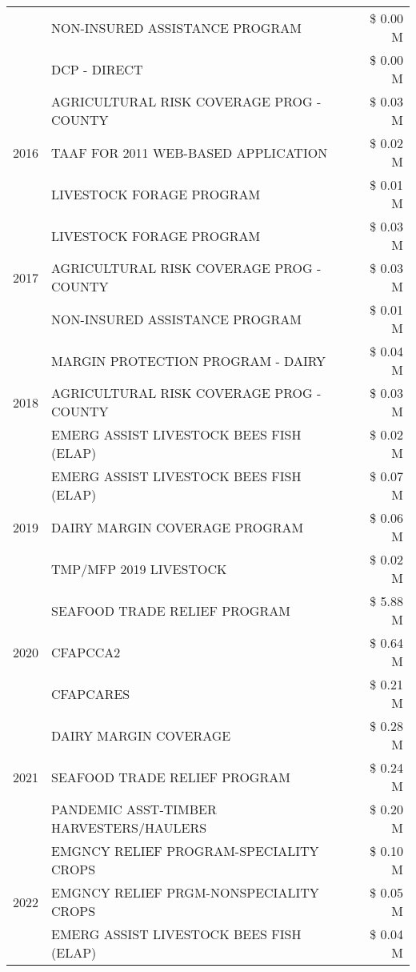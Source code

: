 \begin{tabular}{llr}
 & NON-INSURED ASSISTANCE PROGRAM & \$ 0.00 M \\
 & DCP - DIRECT & \$ 0.00 M \\
\cline{1-3}
\multirow[t]{3}{*}{2016} & AGRICULTURAL RISK COVERAGE PROG - COUNTY & \$ 0.03 M \\
 & TAAF FOR 2011 WEB-BASED APPLICATION & \$ 0.02 M \\
 & LIVESTOCK FORAGE PROGRAM & \$ 0.01 M \\
\cline{1-3}
\multirow[t]{3}{*}{2017} & LIVESTOCK FORAGE PROGRAM & \$ 0.03 M \\
 & AGRICULTURAL RISK COVERAGE PROG - COUNTY & \$ 0.03 M \\
 & NON-INSURED ASSISTANCE PROGRAM & \$ 0.01 M \\
\cline{1-3}
\multirow[t]{3}{*}{2018} & MARGIN PROTECTION PROGRAM - DAIRY & \$ 0.04 M \\
 & AGRICULTURAL RISK COVERAGE PROG - COUNTY & \$ 0.03 M \\
 & EMERG ASSIST LIVESTOCK BEES FISH (ELAP) & \$ 0.02 M \\
\cline{1-3}
\multirow[t]{3}{*}{2019} & EMERG ASSIST LIVESTOCK BEES FISH (ELAP) & \$ 0.07 M \\
 & DAIRY MARGIN COVERAGE PROGRAM & \$ 0.06 M \\
 & TMP/MFP 2019 LIVESTOCK & \$ 0.02 M \\
\cline{1-3}
\multirow[t]{3}{*}{2020} & SEAFOOD TRADE RELIEF PROGRAM & \$ 5.88 M \\
 & CFAPCCA2 & \$ 0.64 M \\
 & CFAPCARES & \$ 0.21 M \\
\cline{1-3}
\multirow[t]{3}{*}{2021} & DAIRY MARGIN COVERAGE & \$ 0.28 M \\
 & SEAFOOD TRADE RELIEF PROGRAM & \$ 0.24 M \\
 & PANDEMIC ASST-TIMBER HARVESTERS/HAULERS & \$ 0.20 M \\
\cline{1-3}
\multirow[t]{3}{*}{2022} & EMGNCY RELIEF PROGRAM-SPECIALITY CROPS & \$ 0.10 M \\
 & EMGNCY RELIEF PRGM-NONSPECIALITY CROPS & \$ 0.05 M \\
 & EMERG ASSIST LIVESTOCK BEES FISH (ELAP) & \$ 0.04 M \\
\cline{1-3}
\bottomrule
\end{tabular}
